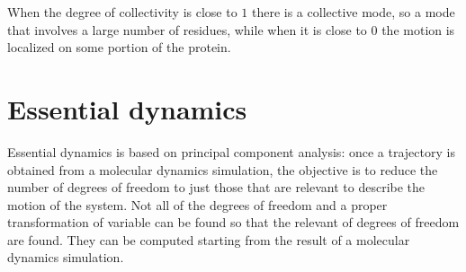 		When the degree of collectivity is close to $1$ there is a collective mode, so a mode that involves a large number of residues, while when it is close to $0$ the motion is localized on some portion of the protein.

\section{Essential dynamics}
Essential dynamics is based on principal component analysis: once a trajectory is obtained from a molecular dynamics simulation, the objective is to reduce the number of degrees of freedom to just those that are relevant to describe the motion of the system.
Not all of the degrees of freedom and a proper transformation of variable can be found so that the relevant of degrees of freedom are found.
They can be computed starting from the result of a molecular dynamics simulation.

